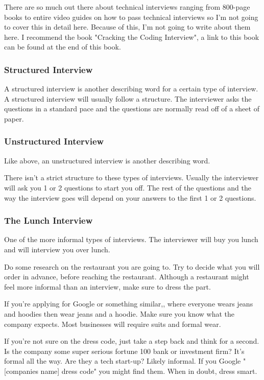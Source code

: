 \documentclass{article}
\begin{document}
There are so much out there about technical interviews ranging from
800-page books to entire video guides on how to pass technical
interviews so I'm not going to cover this in detail here. Because of
this, I'm not going to write about them here. I recommend the book
"Cracking the Coding Interview", a link to this book can be found at
the end of this book.
\subsubsection{Structured Interview}
A structured interview is another describing word for a certain type of
interview. A structured interview will usually follow a structure. The
interviewer asks the questions in a standard pace and the questions are
normally read off of a sheet of paper.
\subsubsection{Unstructured Interview}
Like above, an unstructured interview is another describing word.

There isn't a strict structure to these types of interviews. Usually the
interviewer will ask you 1 or 2 questions to start you off. The rest of
the questions and the way the interview goes will depend on your answers
to the first 1 or 2 questions.
\subsubsection{The Lunch Interview}
One of the more informal types of interviews. The interviewer will buy
you lunch and will interview you over lunch.

Do some research on the restaurant you are going to. Try to decide what
you will order in advance, before reaching the restaurant. Although a
restaurant might feel more informal than an interview, make sure to
dress the part.

If you're applying for Google or something similar,, where everyone
wears jeans and hoodies then wear jeans and a hoodie. Make sure you know
what the company expects. Most businesses will require suits and formal
wear.

If you're not sure on the dress code, just take a step back and think
for a second. Is the company some super serious fortune 100 bank or
investment firm? It's formal all the way. Are they a tech start-up?
Likely informal. If you Google "[companies name] dress code" you
might find them. When in doubt, dress smart.
\end{document}
